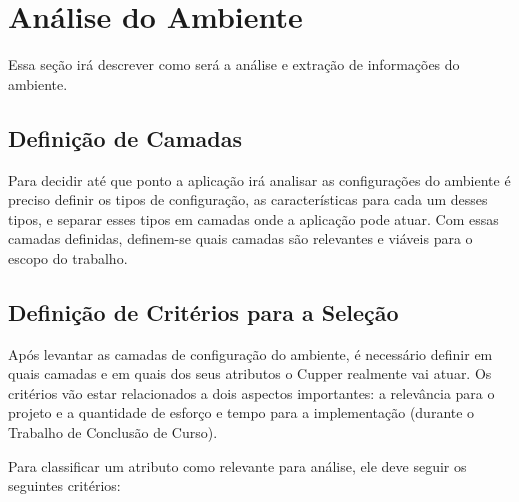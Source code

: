 \section{Análise do Ambiente}
Essa seção irá descrever como será a análise e extração de informações do ambiente. 


\subsection{Definição de Camadas}
Para decidir até que ponto a aplicação irá analisar as configurações
do ambiente é preciso definir os tipos de configuração, as características para
cada um desses tipos, e separar esses tipos em camadas onde a aplicação pode atuar.
Com essas camadas definidas, definem-se quais camadas são relevantes e viáveis
para o escopo do trabalho.

\subsection{Definição de Critérios para a Seleção}
\label{sec:defcritcamada}
Após levantar as camadas de configuração do ambiente, é necessário definir em
quais camadas e em quais dos seus atributos o Cupper realmente vai atuar. 
Os critérios vão estar relacionados a dois aspectos importantes: a relevância 
para o projeto e a quantidade de esforço e tempo para a implementação 
(durante o Trabalho de Conclusão de Curso).

Para classificar um atributo como relevante para análise, ele deve seguir os
seguintes critérios:

